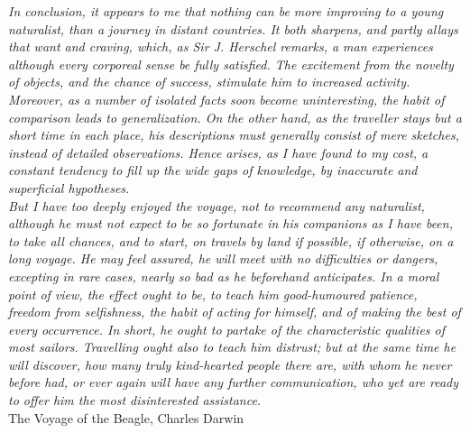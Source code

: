 \clearpage
\begin{center}
\thispagestyle{empty}
\null\vspace{0,2cm}
\footnotesize{ \emph{ In conclusion, it appears to me that nothing can be more improving to a young naturalist, than a journey in distant countries. It both sharpens, and partly allays that want and craving, which, as Sir J. Herschel remarks, a man experiences although every corporeal sense be fully satisfied. The excitement from the novelty of objects, and the chance of success, stimulate him to increased activity. Moreover, as a number of isolated facts soon become uninteresting, the habit of comparison leads to generalization. On the other hand, as the traveller stays but a short time in each place, his descriptions must generally consist of mere sketches, instead of detailed observations. Hence arises, as I have found to my cost, a constant tendency to fill up the wide gaps of knowledge, by inaccurate and superficial hypotheses. \\
But I have too deeply enjoyed the voyage, not to recommend any naturalist, although he must not expect to be so fortunate in his companions as I have been, to take all chances, and to start, on travels by land if possible, if otherwise, on a long voyage. He may feel assured, he will meet with no difficulties or dangers, excepting in rare cases, nearly so bad as he beforehand anticipates. In a moral point of view, the effect ought to be, to teach him good-humoured patience, freedom from selfishness, the habit of acting for himself, and of making the best of every occurrence. In short, he ought to partake of the characteristic qualities of most sailors. Travelling ought also to teach him distrust; but at the same time he will discover, how many truly kind-hearted people there are, with whom he never before had, or ever again will have any further communication, who yet are ready to offer him the most disinterested assistance. \\} The Voyage of the Beagle, Charles Darwin}\\
\null\vspace{0,2cm}
\end{center} %


